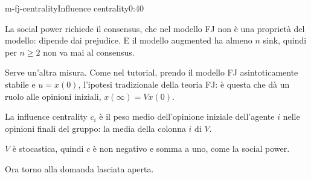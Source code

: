 \begin{slide}{m-fj-centrality}{Influence centrality}{0:40}
  \begin{discorso}
    \item La social power richiede il consensus, che nel modello FJ non è una proprietà del modello: dipende dai prejudice. E il modello augmented ha almeno $n$ sink, quindi per $n\ge2$ non va mai al consensus.
    \item Serve un'altra misura. Come nel tutorial, prendo il modello FJ asintoticamente stabile e $u=x(0)$, l'ipotesi tradizionale della teoria FJ: è questa che dà un ruolo alle opinioni iniziali, $x(\infty)=Vx(0)$.
    \item La influence centrality $c_i$ è il peso medio dell'opinione iniziale dell'agente $i$ nelle opinioni finali del gruppo: la media della colonna $i$ di $V$.
    \item $V$ è stocastica, quindi $c$ è non negativo e somma a uno, come la social power.
    \item Ora torno alla domanda lasciata aperta.
  \end{discorso}
\end{slide}

